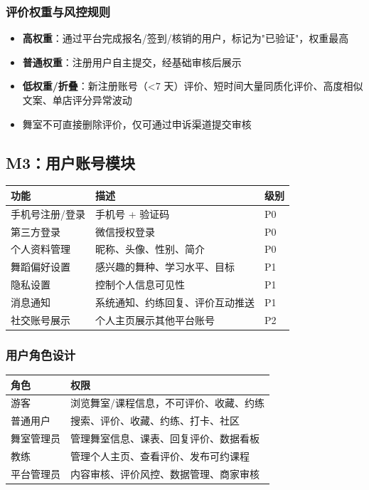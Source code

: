 \documentclass[12pt,a4paper]{ctexart}
\begin{document}
\subsubsection{评价权重与风控规则}

\begin{itemize}
    \item \textbf{高权重}：通过平台完成报名/签到/核销的用户，标记为"已验证"，权重最高
    \item \textbf{普通权重}：注册用户自主提交，经基础审核后展示
    \item \textbf{低权重/折叠}：新注册账号（<7 天）评价、短时间大量同质化评价、高度相似文案、单店评分异常波动
    \item 舞室不可直接删除评价，仅可通过申诉渠道提交审核
\end{itemize}

\subsection{M3：用户账号模块}

\begin{table}[H]
\centering
\begin{tabularx}{\textwidth}{L{3cm}X C{0.8cm}}
\toprule
\textbf{功能} & \textbf{描述} & \textbf{级别} \\
\midrule
手机号注册/登录 & 手机号 + 验证码 & P0 \\
第三方登录 & 微信授权登录 & P0 \\
个人资料管理 & 昵称、头像、性别、简介 & P0 \\
舞蹈偏好设置 & 感兴趣的舞种、学习水平、目标 & P1 \\
隐私设置 & 控制个人信息可见性 & P1 \\
消息通知 & 系统通知、约练回复、评价互动推送 & P1 \\
社交账号展示 & 个人主页展示其他平台账号 & P2 \\
\bottomrule
\end{tabularx}
\end{table}

\subsubsection{用户角色设计}

\begin{table}[H]
\centering
\begin{tabularx}{\textwidth}{L{2.5cm}X}
\toprule
\textbf{角色} & \textbf{权限} \\
\midrule
游客 & 浏览舞室/课程信息，不可评价、收藏、约练 \\
普通用户 & 搜索、评价、收藏、约练、打卡、社区 \\
舞室管理员 & 管理舞室信息、课表、回复评价、数据看板 \\
教练 & 管理个人主页、查看评价、发布可约课程 \\
平台管理员 & 内容审核、评价风控、数据管理、商家审核 \\
\bottomrule
\end{tabularx}
\end{table}
\end{document}
